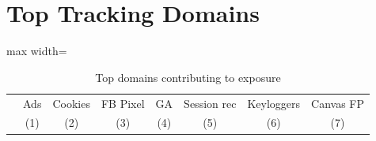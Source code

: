 \documentclass[12pt, letterpaper]{article}
\begin{document}
\section{Top Tracking Domains}
\label{sm:top_tracking_domains}
% 
\begin{table}[ht]
\centering
\setlength\tabcolsep{2 pt}
\setlength{\defaultaddspace}{0pt}
\def\sym#1{\ifmmode^{#1}\else\(^{#1}\)\fi}
\caption{Top domains contributing to exposure}
\label{tab:bl_top_contributors_domain}
\begingroup
\centering
\begin{adjustbox}{max width=\textwidth}
\begin{tabular}{@{\hspace{0\tabcolsep}}llllllll@{\hspace{0\tabcolsep}}}
      \toprule
      &\multicolumn{1}{c}{Ads}&\multicolumn{1}{c}{Cookies}&\multicolumn{1}{c}{FB Pixel}&\multicolumn{1}{c}{GA}&\multicolumn{1}{c}{Session rec}&\multicolumn{1}{c}{Keyloggers}&\multicolumn{1}{c}{Canvas FP}\\
      &\multicolumn{1}{c}{(1)}&\multicolumn{1}{c}{(2)}&\multicolumn{1}{c}{(3)}&\multicolumn{1}{c}{(4)}&\multicolumn{1}{c}{(5)}&\multicolumn{1}{c}{(6)}&\multicolumn{1}{c}{(7)}\\
      \midrule
      

\end{tabular}
\end{adjustbox}
\end{table}
\end{document}
